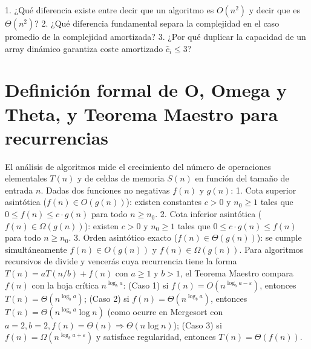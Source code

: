 \documentclass{book}
\begin{document}
\begin{tcolorbox}[title={Autoficha}, studiumcheck, breakable]

1. ¿Qué diferencia existe entre decir que un algoritmo es \(O(n^2)\) y decir que es \(\Theta(n^2)\)? 2. ¿Qué diferencia fundamental separa la complejidad en el caso promedio de la complejidad amortizada? 3. ¿Por qué duplicar la capacidad de un array dinámico garantiza coste amortizado \(\hat{c}_i \le 3\)?
\end{tcolorbox}

\section{Definición formal de O, Omega y Theta, y Teorema Maestro para recurrencias}

El análisis de algoritmos mide el crecimiento del número de operaciones elementales \(T(n)\) y de celdas de memoria \(S(n)\) en función del tamaño de entrada \(n\). Dadas dos funciones no negativas \(f(n)\) y \(g(n)\):
1. Cota superior asintótica (\(f(n) \in O(g(n))\)): existen constantes \(c > 0\) y \(n_0 \ge 1\) tales que \(0 \le f(n) \le c \cdot g(n)\) para todo \(n \ge n_0\).
2. Cota inferior asintótica (\(f(n) \in \Omega(g(n))\)): existen \(c > 0\) y \(n_0 \ge 1\) tales que \(0 \le c \cdot g(n) \le f(n)\) para todo \(n \ge n_0\).
3. Orden asintótico exacto (\(f(n) \in \Theta(g(n))\)): se cumple simultáneamente \(f(n) \in O(g(n))\) y \(f(n) \in \Omega(g(n))\).
Para algoritmos recursivos de divide y vencerás cuya recurrencia tiene la forma \(T(n) = a T(n/b) + f(n)\) con \(a \ge 1\) y \(b > 1\), el Teorema Maestro compara \(f(n)\) con la hoja crítica \(n^{\log_b a}\): (Caso 1) si \(f(n) = O(n^{\log_b a - \varepsilon})\), entonces \(T(n) = \Theta(n^{\log_b a})\); (Caso 2) si \(f(n) = \Theta(n^{\log_b a})\), entonces \(T(n) = \Theta(n^{\log_b a} \log n)\) (como ocurre en Mergesort con \(a=2, b=2, f(n)=\Theta(n) \Rightarrow \Theta(n \log n)\)); (Caso 3) si \(f(n) = \Omega(n^{\log_b a + \varepsilon})\) y satisface regularidad, entonces \(T(n) = \Theta(f(n))\).
\end{document}
